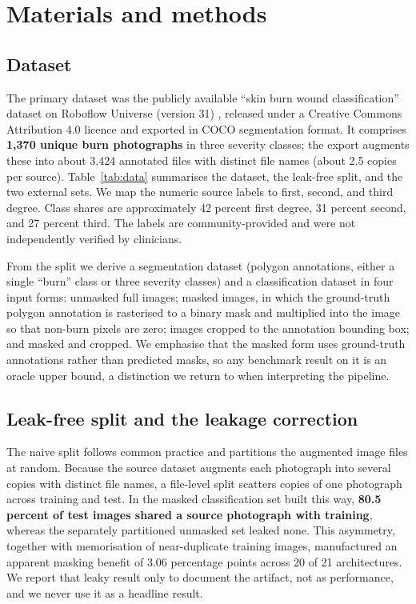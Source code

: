 \documentclass{elektr}
\begin{document}
\section{Materials and methods}
\label{Mat}
\subsection{Dataset}
\label{Mat:data}
The primary dataset was the publicly available ``skin burn wound classification'' dataset on Roboflow Universe (version 31) \cite{roboflow}, released under a Creative Commons Attribution 4.0 licence and exported in COCO segmentation format. It comprises \textbf{1{,}370 unique burn photographs} in three severity classes; the export augments these into about 3{,}424 annotated files with distinct file names (about 2.5 copies per source). Table~\ref{tab:data} summarises the dataset, the leak-free split, and the two external sets. We map the numeric source labels to first, second, and third degree. Class shares are approximately 42 percent first degree, 31 percent second, and 27 percent third. The labels are community-provided and were not independently verified by clinicians.

From the split we derive a segmentation dataset (polygon annotations, either a single ``burn'' class or three severity classes) and a classification dataset in four input forms: unmasked full images; masked images, in which the ground-truth polygon annotation is rasterised to a binary mask and multiplied into the image so that non-burn pixels are zero; images cropped to the annotation bounding box; and masked and cropped. We emphasise that the masked form uses ground-truth annotations rather than predicted masks, so any benchmark result on it is an oracle upper bound, a distinction we return to when interpreting the pipeline.

\subsection{Leak-free split and the leakage correction}
\label{Mat:leak}
The naive split follows common practice and partitions the augmented image files at random. Because the source dataset augments each photograph into several copies with distinct file names, a file-level split scatters copies of one photograph across training and test. In the masked classification set built this way, \textbf{80.5 percent of test images shared a source photograph with training}, whereas the separately partitioned unmasked set leaked none. This asymmetry, together with memorisation of near-duplicate training images, manufactured an apparent masking benefit of 3.06 percentage points across 20 of 21 architectures. We report that leaky result only to document the artifact, not as performance, and we never use it as a headline result.
\end{document}
